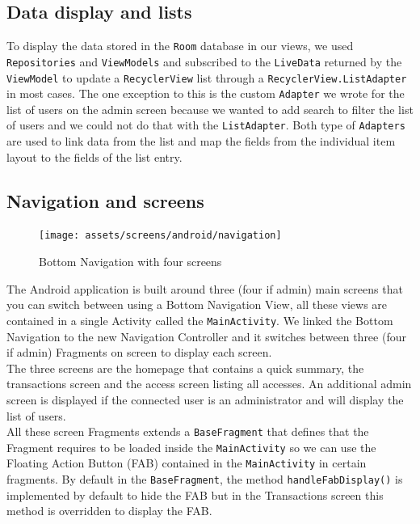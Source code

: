 \documentclass[twoside, openright,11pt,a4paper]{book}
\begin{document}
\subsection{Data display and lists}
To display the data stored in the \verb+Room+ database in our views, we used \\\verb+Repositories+ and \verb+ViewModels+ and subscribed to the \verb+LiveData+ returned by the \verb+ViewModel+ to update a \verb+RecyclerView+\cite{android:doc:recycler} list through a \verb+RecyclerView.ListAdapter+\cite{android:doc:recycler:listadapter} in most cases. The one exception to this is the custom \verb+Adapter+\cite{android:doc:recycler:adapter} we wrote for the list of users on the admin screen because we wanted to add search to filter the list of users and we could not do that with the \verb+ListAdapter+. Both type of \verb+Adapters+ are used to link data from the list and map the fields from the individual item layout to the fields of the list entry.

\subsection{Navigation and screens}
\begin{figure}[H]
\begin{center}
	\texttt{[image: assets/screens/android/navigation]}
	\caption{Bottom Navigation with four screens}
\end{center}
\end{figure}

The Android application is built around three (four if admin) main screens that you can switch between using a Bottom Navigation View\cite{android:doc:material:bottom_nav}, all these views are contained in a single Activity called the \verb+MainActivity+. We linked the Bottom Navigation to the new Navigation Controller and it switches between three (four if admin) Fragments on screen to display each screen.\\ The three screens are the homepage that contains a quick summary, the transactions screen and the access screen listing all accesses. An additional admin screen is displayed if the connected user is an administrator and will display the list of users. \\

All these screen Fragments extends a \verb+BaseFragment+ that defines that the Fragment requires to be loaded inside the \verb+MainActivity+ so we can use the Floating Action Button (FAB)\cite{android:doc:material:fab} contained in the \verb+MainActivity+ in certain fragments. By default in the \verb+BaseFragment+, the method \verb+handleFabDisplay()+ is implemented by default to hide the FAB but in the Transactions screen this method is overridden to display the FAB. 
\end{document}
